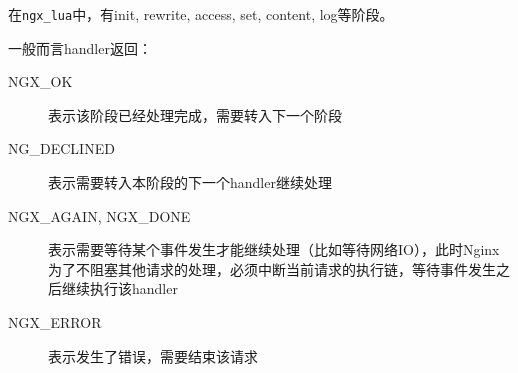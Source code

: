 在\verb$ngx_lua$中，有init, rewrite, access, set, content, log等阶段。

一般而言handler返回：
\begin{description}
\item [NGX\_OK]表示该阶段已经处理完成，需要转入下一个阶段
\item [NG\_DECLINED]表示需要转入本阶段的下一个handler继续处理
\item [NGX\_AGAIN, NGX\_DONE]表示需要等待某个事件发生才能继续处理（比如等待网络IO），此时Nginx为了不阻塞其他请求的处理，必须中断当前请求的执行链，等待事件发生之后继续执行该handler
\item [NGX\_ERROR]表示发生了错误，需要结束该请求
\end{description}



